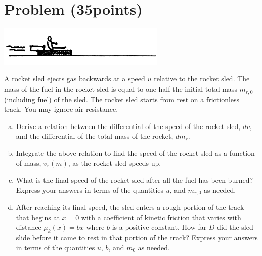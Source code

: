 \documentclass[problems]{esg8012exam}
\begin{document}
\section{Problem \thesection\space(35\space points)}
  \begin{center}\includegraphics[width=0.6\textwidth]{exam2_p3_1}\end{center}
  A rocket sled ejects gas backwards at a speed $u$ relative to the rocket sled. The mass of the fuel in the rocket sled is equal to one half the initial total mass $m_{r,0}$ (including fuel) of the sled.  The rocket sled starts from rest on a frictionless track. You may ignore air resistance.
  \begin{enumerate}[(a)]
    \item Derive a relation between the differential of the speed of the rocket sled, $dv$, and the differential of the total mass of the rocket, $dm_r$.
    \item Integrate the above relation to find the speed of the rocket sled as a function of mass, $v_r(m)$, as the rocket sled speeds up.
    \item What is the final speed of the rocket sled after all the fuel has been burned?  Express your answers in terms of the quantities $u$, and $m_{r,0}$ as needed.
    \item After reaching its final speed, the sled enters a rough portion of the track that begins at $x=0$ with a coefficient of kinetic friction that varies with distance $\mu_k(x) = bx$ where $b$ is a positive constant.  How far $D$ did the sled slide before it came to rest in that portion of the track? Express your answers in terms of the quantities $u$, $b$, and $m_0$ as needed.
  \end{enumerate}
\end{document}
